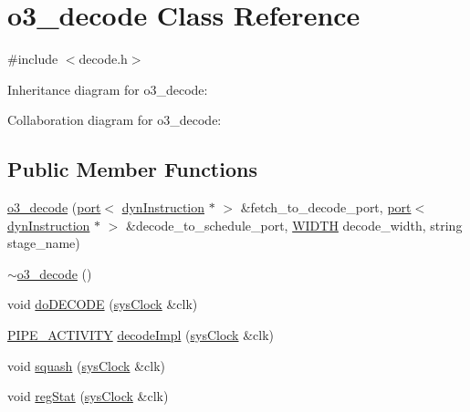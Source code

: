 \hypertarget{classo3__decode}{
\section{o3\_\-decode Class Reference}
\label{classo3__decode}
}


{\ttfamily \#include $<$decode.h$>$}



Inheritance diagram for o3\_\-decode:


Collaboration diagram for o3\_\-decode:
\subsection*{Public Member Functions}
\begin{DoxyCompactItemize}
\item 
\hyperlink{classo3__decode_a1a08ce6eaa15d73ca989efcb4aff2eb5}{o3\_\-decode} (\hyperlink{classport}{port}$<$ \hyperlink{classdynInstruction}{dynInstruction} $\ast$ $>$ \&fetch\_\-to\_\-decode\_\-port, \hyperlink{classport}{port}$<$ \hyperlink{classdynInstruction}{dynInstruction} $\ast$ $>$ \&decode\_\-to\_\-schedule\_\-port, \hyperlink{global_2global_8h_a6fa2e24b8a418fa215e183264cbea3aa}{WIDTH} decode\_\-width, string stage\_\-name)
\item 
\hyperlink{classo3__decode_ac330314db5e6712640a594f0b9a424bf}{$\sim$o3\_\-decode} ()
\item 
void \hyperlink{classo3__decode_a15bf9466b893eb943e0bf245fb6513fa}{doDECODE} (\hyperlink{classsysClock}{sysClock} \&clk)
\item 
\hyperlink{unit_2stage_8h_ab00e4188e8b8974fecb1dfd12764cbb1}{PIPE\_\-ACTIVITY} \hyperlink{classo3__decode_a4421fc831622c76327f75aa763538a0d}{decodeImpl} (\hyperlink{classsysClock}{sysClock} \&clk)
\item 
void \hyperlink{classo3__decode_ab7338585819cf9e105ee595e6cb22e4b}{squash} (\hyperlink{classsysClock}{sysClock} \&clk)
\item 
void \hyperlink{classo3__decode_a925f874ac7b0ae24ff5946d468615017}{regStat} (\hyperlink{classsysClock}{sysClock} \&clk)
\end{DoxyCompactItemize}


